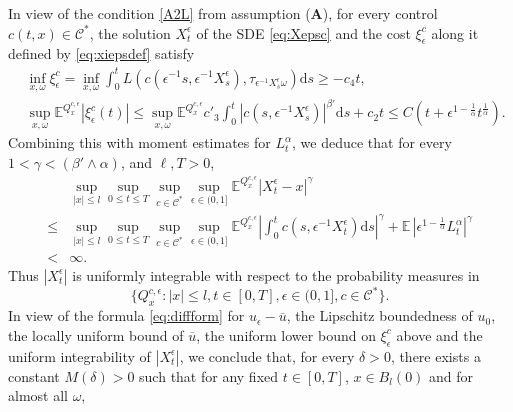 \documentclass[11pt,reqno]{amsart}
\theoremstyle{definition}
\theoremstyle{remark}
\numberwithin{equation}{section}
\newcommand{\eps}{\epsilon}
\newcommand{\ol}{\overline}
\begin{document}
In view of the condition \eqref{A2L} from assumption ({\bf{A}}), for every control $c(t,x)\in \mathscr{C}^{\ast}$, the solution $X^\eps_t$ of the SDE \eqref{eq:Xepsc} and the cost $\xi^c_\epsilon$ along it defined by \eqref{eq:xiepsdef} satisfy
\begin{equation}
\begin{aligned}
&\inf_{x,\omega} \xi^c_{\epsilon} = \inf_{x,\omega} \int^{t}_{0} L(c(\epsilon^{-1}s,\epsilon^{-1}X^{\epsilon}_{s}),\tau_{\epsilon^{-1}X^{\epsilon}_{s}\omega})\mathrm{d}s \geq -c_{4}t, \\
&\sup_{x,\omega}\mathbb{E}^{Q^{c,\epsilon}_{x}}|\xi^c_{\epsilon}(t)|\leq \sup_{x,\omega}\mathbb{E}^{Q^{c,\epsilon}_{x}} c'_3\int^{t}_{0} |c(s,\epsilon^{-1}X^{\epsilon}_{s})|^{\beta'} \mathrm{d}s + c_2 t \leq  C(t + \epsilon^{1-\frac1\alpha} t^{\frac{1}{\alpha}}).
\end{aligned}
\end{equation}
Combining this with moment estimates for $L^{\alpha}_{t}$, we deduce that for every $1 < \gamma < (\beta' \wedge \alpha)$, and $\ell, T>0$,
\begin{align*}
    & \sup_{|x| \leq l}\sup_{0\leq t \leq T}\sup_{c\in \mathscr{C}^{\ast}}\sup_{\epsilon\in (0,1]}\mathbb{E}^{Q^{c,\epsilon}_{x}} |X^{\epsilon}_{t} - x|^{\gamma} \nonumber \\
    \leq & \sup_{|x| \leq l}\sup_{0\leq t \leq T}\sup_{c\in \mathscr{C}^{\ast}}\sup_{\epsilon\in (0,1]}\mathbb{E}^{Q^{c,\epsilon}_{x}}\left|\int^{t}_{0} c(s, \epsilon^{-1}X^{\epsilon}_{t}) \mathrm{d}s\right|^{\gamma} + \mathbb{E}\,|\epsilon^{1-\frac{1}{\alpha}}L^{\alpha}_t|^{\gamma} \nonumber \\
    < & \infty.
\end{align*}
Thus $|X^{\epsilon}_{t}|$ is uniformly integrable with respect to the probability measures in
\begin{equation}
\label{eq:UImeasset}
    \{Q^{c,\epsilon}_{x}: |x| \leq l, t\in [0,T], \epsilon\in (0,1], c\in \mathscr{C}^{\ast}\}.
\end{equation}
In view of the formula \eqref{eq:diffform} for $u_\eps-\ol{u}$, the Lipschitz boundedness of $u_0$, the locally uniform bound of $\ol{u}$, the uniform lower bound on $\xi^c_\eps$ above and the uniform integrability of $|X^\eps_t|$, we conclude that, for every $\delta >0$, there exists a constant $M(\delta)>0$ such that for any fixed $t \in [0,T]$, $x\in B_l(0)$ and for almost all $\omega$, 
\end{document}
